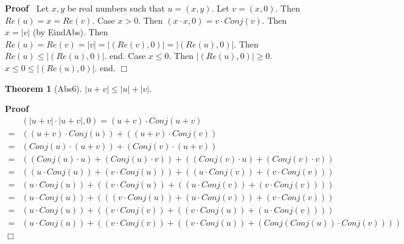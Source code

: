 \documentclass{article}
\newenvironment{forthel}{\begin{leftbar}}{\end{leftbar}}
\newenvironment{proof}{\noindent\textbf{Proof\ }}{\hspace*{\fill}$\Box$\medskip}
\newtheorem{theorem}{Theorem}
\newcommand{\cmul}{\cdot}
\newcommand{\cadd}{+}
\begin{document}
\begin{forthel}
\begin{proof}
Let $x,y$ be real numbers such that $u = (x,y)$.\newline
Let $v = (x, 0)$.\newline
Then $Re(u) = x = Re(v)$.\newline\newline
Case $x > 0$.\newline
Then $(x \cdot x,0) = v \cmul Conj(v)$.\newline
Then $x = |v|$ (by EindAbs).\newline
Then $Re(u)=Re(v)=|v|=|(Re(v),0)| = |(Re(u),0)|$.\newline
Then $Re(u)  \leq  |(Re(u),0)|$.\newline
end.\newline\newline
Case $x  \leq  0$.\newline
Then $|(Re(u),0)|  \geq 0$.\newline
$x  \leq  0  \leq  |(Re(u),0)|$.\newline
end.
\end{proof}
\begin{theorem}[Abs6] $|u  \cadd  v|  \leq  |u| + |v|$.
\end{theorem}\begin{proof}
 \begin{align*}
 &(|u  \cadd  v| \cdot |u  \cadd  v|,0)	= (u  \cadd  v)  \cmul  Conj(u  \cadd  v)\\
=  &((u  \cadd  v)  \cmul  Conj(u))  \cadd  ((u  \cadd  v)  \cmul  Conj(v)) \\
=  &(Conj(u)  \cmul  (u  \cadd  v))  \cadd  (Conj(v)  \cmul  (u  \cadd  v)) \\
=  &((Conj(u)  \cmul  u)  \cadd  (Conj(u)  \cmul  v))  \cadd  ((Conj(v)  \cmul  u)  \cadd  (Conj(v)  \cmul  v)) \\
=  &((u  \cmul  Conj(u))  \cadd  (v  \cmul  Conj(u)))  \cadd  ((u  \cmul  Conj(v))  \cadd  (v  \cmul  Conj(v)))\\
=  &(u  \cmul  Conj(u))  \cadd  ((v  \cmul  Conj(u))  \cadd  ((u  \cmul  Conj(v))  \cadd  (v  \cmul  Conj(v))))\\
=  &(u  \cmul  Conj(u))  \cadd  (((v  \cmul  Conj(u))  \cadd  (u  \cmul  Conj(v)))  \cadd  (v  \cmul  Conj(v)))\\
=  &(u  \cmul  Conj(u))  \cadd  ((v  \cmul  Conj(v))  \cadd  ((v  \cmul  Conj(u))  \cadd  (u  \cmul  Conj(v)))) \\
=  &(u  \cmul  Conj(u))  \cadd  ((v  \cmul  Conj(v))  \cadd  ((v  \cmul  Conj(u))  \cadd  (Conj(Conj(u))  \cmul  Conj(v))))\\

\end{align*}
\end{proof}
\end{forthel}
\end{document}

